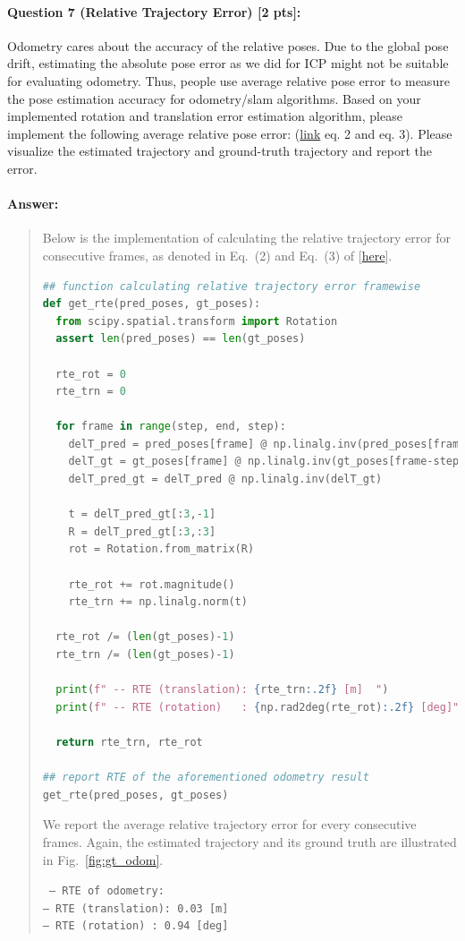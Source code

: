 \documentclass[11pt]{article}
\begin{document}
\paragraph{Question 7 (Relative Trajectory Error) [2 pts]:}
Odometry cares about the accuracy of the relative poses. Due to the global pose drift, estimating the absolute pose error as we did for ICP might not be suitable for evaluating odometry. Thus, people use average relative pose error to measure the pose estimation accuracy for odometry/slam algorithms. Based on your implemented rotation and translation error estimation algorithm, please implement the following average relative pose error: (\href{http://www.cvlibs.net/publications/Geiger2012CVPR.pdf}{link} eq. 2 and eq. 3). Please visualize the estimated trajectory and ground-truth trajectory and report the error. 
\paragraph{Answer:} 
\begin{quote}

Below is the implementation of calculating the relative trajectory error for consecutive frames, as denoted in Eq.~(2) and Eq.~(3) of [\href{http://www.cvlibs.net/publications/Geiger2012CVPR.pdf}{here}]. 

\begin{lstlisting}[language=Python, basicstyle=\scriptsize]
## function calculating relative trajectory error framewise
def get_rte(pred_poses, gt_poses):
  from scipy.spatial.transform import Rotation
  assert len(pred_poses) == len(gt_poses)

  rte_rot = 0
  rte_trn = 0

  for frame in range(step, end, step):
    delT_pred = pred_poses[frame] @ np.linalg.inv(pred_poses[frame-step])
    delT_gt = gt_poses[frame] @ np.linalg.inv(gt_poses[frame-step])
    delT_pred_gt = delT_pred @ np.linalg.inv(delT_gt)
    
    t = delT_pred_gt[:3,-1]
    R = delT_pred_gt[:3,:3]
    rot = Rotation.from_matrix(R)
    
    rte_rot += rot.magnitude()
    rte_trn += np.linalg.norm(t)

  rte_rot /= (len(gt_poses)-1)
  rte_trn /= (len(gt_poses)-1)

  print(f" -- RTE (translation): {rte_trn:.2f} [m]  ")
  print(f" -- RTE (rotation)   : {np.rad2deg(rte_rot):.2f} [deg]")

  return rte_trn, rte_rot

## report RTE of the aforementioned odometry result
get_rte(pred_poses, gt_poses)
\end{lstlisting}

We report the average relative trajectory error for every consecutive frames. Again, the estimated trajectory and its ground truth are illustrated in Fig.~\ref{fig:gt_odom}.

{\tt
-- RTE of odometry:                 \\
-- RTE (translation): 0.03 [m]      \\
-- RTE (rotation)   : 0.94 [deg]    
}

\end{quote}
\end{document}
